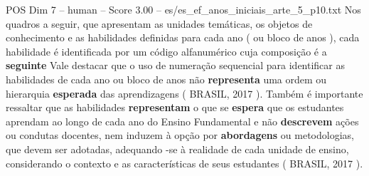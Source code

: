 \begin{textsample}{POS Dim 7 – human – Score 3.00 – es/es\_ef\_anos\_iniciais\_arte\_5\_p10.txt}  \label{ex:f7_pos_011}
Nos quadros a seguir, que apresentam as unidades temáticas, os objetos de conhecimento e as habilidades definidas para cada ano ( ou bloco de anos ), cada habilidade é identificada por um código alfanumérico cuja composição é a \textbf{seguinte} Vale destacar que o uso de numeração sequencial para identificar as habilidades de cada ano ou bloco de anos não \textbf{representa} uma ordem ou hierarquia \textbf{esperada} das aprendizagens ( BRASIL, 2017 ).
Também é importante ressaltar que as habilidades \textbf{representam} o que se \textbf{espera} que os estudantes aprendam ao longo de cada ano do Ensino Fundamental e não \textbf{descrevem} ações ou condutas docentes, nem induzem à opção por \textbf{abordagens} ou metodologias, que devem ser adotadas, adequando -se à realidade de cada unidade de ensino, considerando o contexto e as características de seus estudantes ( BRASIL, 2017 ).

\end{textsample}
